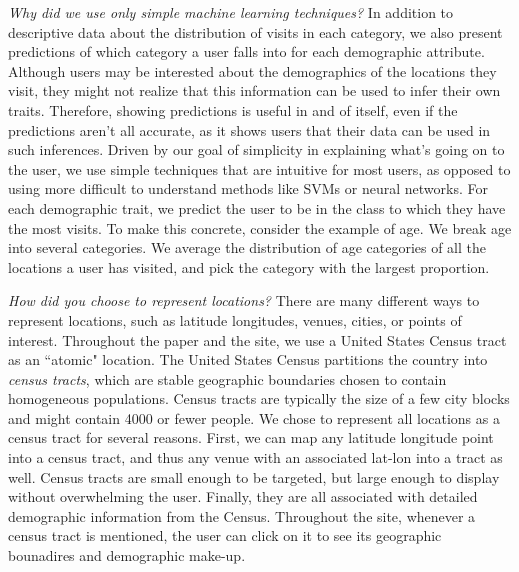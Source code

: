 \emph{Why did we use only simple machine learning techniques?}
In addition to descriptive data about the distribution of visits in each category, we also present predictions of which category a user falls into for each demographic attribute. Although users may be interested about the demographics of the locations they visit, they might not realize that this information can be used to infer their own traits. Therefore, showing predictions is useful in and of itself, even if the predictions aren't all accurate, as it shows users that their data can be used in such inferences.
Driven by our goal of simplicity in explaining what's going on to the user, we use simple techniques that are intuitive for most users, as opposed to using more difficult to understand methods like SVMs or neural networks. For each demographic trait, we predict the user to be in the class to which they have the most visits. To make this concrete, consider the example of age. We break age into several categories. 
We average the distribution of age categories of all the locations a user has visited, and pick the category with the largest proportion. 

\emph{How did you choose to represent locations?}
There are many different ways to represent locations, such as latitude longitudes, venues, cities, or points of interest.
Throughout the paper and the site, we use a United States Census tract as an ``atomic" location.
The United States Census partitions the country into \emph{census tracts}, which are stable geographic boundaries chosen to contain homogeneous populations.
Census tracts are typically the size of a few city blocks and might contain 4000 or fewer people.
We chose to represent all locations as a census tract for several reasons.
First, we can map any latitude longitude point into a census tract, and thus any venue with an associated lat-lon into a tract as well.
Census tracts are small enough to be targeted, but large enough to display without overwhelming the user.
Finally, they are all associated with detailed demographic information from the Census.
Throughout the site, whenever a census tract is mentioned, the user can click on it to see its geographic bounadires and demographic make-up.



